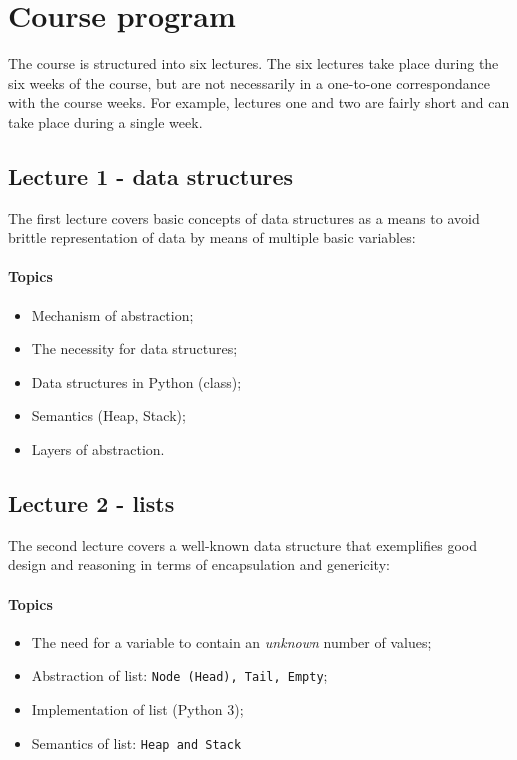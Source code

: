 \section{Course program}
	The course is structured into six lectures. The six lectures take place during the six weeks of the course, but are not necessarily in a one-to-one correspondance with the course weeks. For example, lectures one and two are fairly short and can take place during a single week.

	\subsection{Lecture 1 - data structures}
		The first lecture covers basic concepts of data structures as a means to avoid brittle representation of data by means of multiple basic variables:

		\paragraph*{Topics}
			\begin{itemize}
				\item Mechanism of abstraction;
				\item The necessity for data structures;
				\item Data structures in Python (class);
				\item Semantics (Heap, Stack);
				\item Layers of abstraction.
			\end{itemize}

			\subsection{Lecture 2 - lists}
				The second lecture covers a well-known data structure that exemplifies good design and reasoning in terms of encapsulation and genericity:

				\paragraph*{Topics}
					\begin{itemize}
						\item The need for a variable to contain an \textit{unknown} number of values;
						\item Abstraction of list: \texttt{Node (Head), Tail, Empty};
						\item Implementation of list (Python 3);
						\item Semantics of list: \texttt{Heap and Stack}
					\end{itemize}


